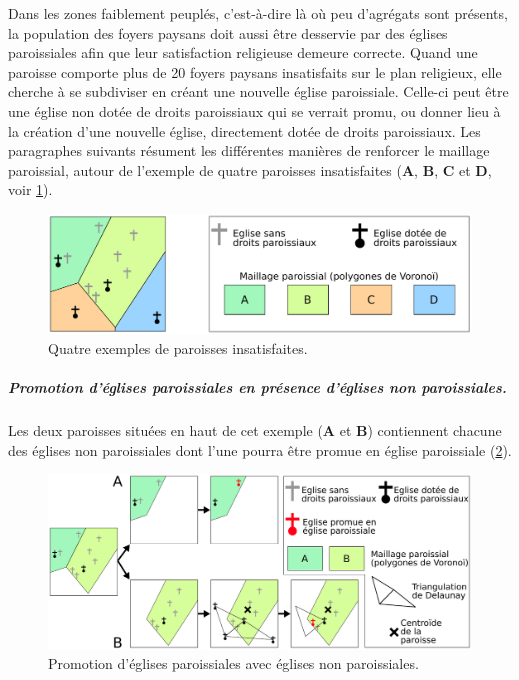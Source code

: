 Dans les zones faiblement peuplés, c'est-à-dire là où peu d'agrégats sont présents, la population des foyers paysans doit aussi être desservie par des églises paroissiales afin que leur satisfaction religieuse demeure correcte.
Quand une paroisse comporte plus de 20 foyers paysans insatisfaits sur le plan religieux, elle cherche à se subdiviser en créant une nouvelle église paroissiale.
Celle-ci peut être une église non dotée de droits paroissiaux qui se verrait promu, ou donner lieu à la création d'une nouvelle église, directement dotée de droits paroissiaux.
Les paragraphes suivants résument les différentes manières de renforcer le maillage paroissial, autour de l'exemple de quatre paroisses insatisfaites (\textbf{A}, \textbf{B}, \textbf{C} et \textbf{D}, voir \cref{fig:promotion-paroisses-base}).

\begin{figure}[H]
	\centering
	\includegraphics[width=1\linewidth]{img/promo_creation_paroisses_base.pdf}
	\caption{Quatre exemples de paroisses insatisfaites.}
	\label{fig:promotion-paroisses-base}
\end{figure}


\subparagraph{Promotion d'églises paroissiales en présence d'églises non paroissiales.}
Les deux paroisses situées en haut de cet exemple (\textbf{A} et \textbf{B}) contiennent chacune des églises non paroissiales dont l'une pourra être promue en église paroissiale (\cref{fig:promotion-paroisses-1}).

\begin{figure}[H]
	\centering
	\includegraphics[width=1\linewidth]{img/promo_creation_paroisses_promo1.pdf}
	\caption{Promotion d'églises paroissiales avec églises non paroissiales.}
	\label{fig:promotion-paroisses-1}
\end{figure}


